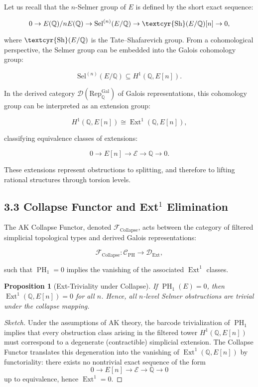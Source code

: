 \documentclass[11pt]{article}
\newtheorem{proposition}[theorem]{Proposition}
\DeclareMathOperator{\Ext}{Ext}
\DeclareMathOperator{\PH}{PH}
\newcommand{\QQ}{\mathbb{Q}}
\newcommand{\Sha}{\text{\textcyr{Sh}}}
\begin{document}
Let us recall that the $n$-Selmer group of $E$ is defined by the short exact sequence:

\[
0 \to E(\QQ)/nE(\QQ) \to \mathrm{Sel}^{(n)}(E/\QQ) \to \Sha(E/\QQ)[n] \to 0,
\]

where $\Sha(E/\QQ)$ is the Tate–Shafarevich group.  
From a cohomological perspective, the Selmer group can be embedded into the Galois cohomology group:

\[
\mathrm{Sel}^{(n)}(E/\QQ) \subseteq H^1(\QQ,E[n]).
\]

In the derived category $\mathcal{D}(\mathrm{Rep}_{\QQ}^{\text{Gal}})$ of Galois representations, this cohomology group can be interpreted as an extension group:

\[
H^1(\QQ,E[n]) \cong \Ext^1(\QQ,E[n]),
\]

classifying equivalence classes of extensions:

\[
0 \to E[n] \to \mathcal{E} \to \QQ \to 0.
\]

These extensions represent obstructions to splitting, and therefore to lifting rational structures through torsion levels.

\subsection{3.3 Collapse Functor and Ext$^1$ Elimination}

The AK Collapse Functor, denoted $\mathcal{F}_{\mathrm{Collapse}}$, acts between the category of filtered simplicial topological types and derived Galois representations:

\[
\mathcal{F}_{\mathrm{Collapse}}: \mathcal{C}_{\mathrm{PH}} \to \mathcal{D}_{\mathrm{Ext}},
\]

such that $\PH_1 = 0$ implies the vanishing of the associated $\Ext^1$ classes.

\begin{proposition}[Ext-Triviality under Collapse]
\label{prop:ext-collapse}
If $\PH_1(E) = 0$, then $\Ext^1(\QQ,E[n]) = 0$ for all $n$.  
Hence, all $n$-level Selmer obstructions are trivial under the collapse mapping.
\end{proposition}

\begin{proof}[Sketch]
Under the assumptions of AK theory, the barcode trivialization of $\PH_1$ implies that every obstruction class arising in the filtered tower $H^1(\QQ,E[n])$ must correspond to a degenerate (contractible) simplicial extension.  
The Collapse Functor translates this degeneration into the vanishing of $\Ext^1(\QQ,E[n])$ by functoriality: there exists no nontrivial exact sequence of the form
\[
0 \to E[n] \to \mathcal{E} \to \QQ \to 0
\]
up to equivalence, hence $\Ext^1 = 0$.
\end{proof}
\end{document}

